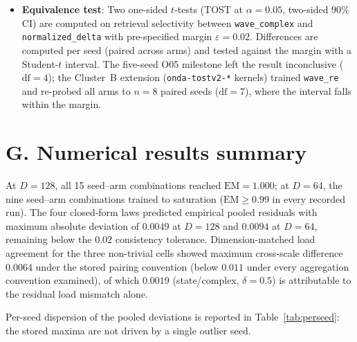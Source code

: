 \documentclass[11pt,a4paper]{article}
\begin{document}
\begin{itemize}
  \item \textbf{Equivalence test}: Two one-sided $t$-tests (TOST at $\alpha=0.05$, two-sided $90\%$ CI) are computed on retrieval selectivity between \texttt{wave\_complex} and \texttt{normalized\_delta} with pre-specified margin $\varepsilon=0.02$. Differences are computed per seed (paired across arms) and tested against the margin with a Student-$t$ interval. The five-seed O05 milestone left the result inconclusive ($\mathrm{df}=4$); the Cluster~B extension (\texttt{onda-tostv2-*} kernels) trained \texttt{wave\_re} and re-probed all arms to $n=8$ paired seeds ($\mathrm{df}=7$), where the interval falls within the margin.
\end{itemize}

\section{G. Numerical results summary}\label{sec:G}

At $D=128$, all 15 seed--arm combinations reached $\mathrm{EM}=1.000$; at $D=64$, the nine seed--arm combinations trained to saturation ($\mathrm{EM} \ge 0.99$ in every recorded run). The four closed-form laws predicted empirical pooled residuals with maximum absolute deviation of $0.0049$ at $D=128$ and $0.0094$ at $D=64$, remaining below the $0.02$ consistency tolerance. Dimension-matched load agreement for the three non-trivial cells showed maximum cross-scale difference $0.0064$ under the stored pairing convention (below $0.011$ under every aggregation convention examined), of which $0.0019$ (state/complex, $\delta=0.5$) is attributable to the residual load mismatch alone.

Per-seed dispersion of the pooled deviations is reported in Table~\ref{tab:perseed}: the stored maxima are not driven by a single outlier seed.
\end{document}
